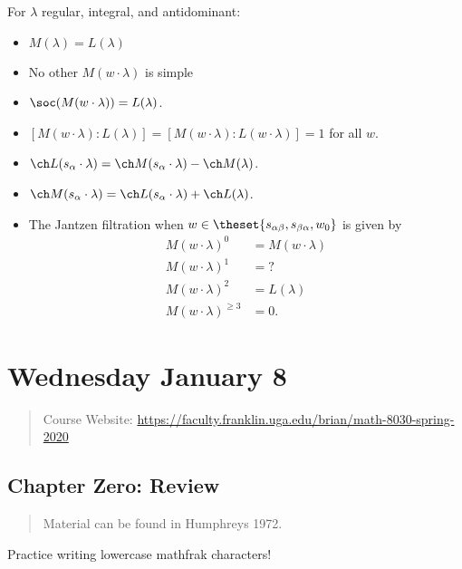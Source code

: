 For \(\lambda\) regular, integral, and antidominant:

\begin{itemize}
\tightlist
\item
  \(M(\lambda) = L(\lambda)\)
\item
  No other \(M(w\cdot \lambda)\) is simple
\item
  \(\soc(M(w\cdot \lambda)) = L(\lambda)\).
\item
  \([M(w\cdot \lambda) : L(\lambda)] = [M(w\cdot \lambda) : L(w\cdot \lambda)] = 1\)
  for all \(w\).
\item
  \(\ch L(s_\alpha \cdot \lambda) = \ch M(s_\alpha \cdot \lambda) - \ch M(\lambda)\).
\item
  \(\ch M(s_\alpha \cdot \lambda) = \ch L(s_\alpha \cdot \lambda) + \ch L(\lambda)\).
\item
  The Jantzen filtration when
  \(w \in \theset{s_{\alpha\beta}, s_{\beta\alpha}, w_0}\) is given by
  \begin{align*}
  M(w\cdot \lambda)^0 &= M(w\cdot \lambda) \\
  M(w\cdot \lambda)^1 &= ? \\
  M(w\cdot \lambda)^2 &= L(\lambda) \\
  M(w\cdot \lambda)^{\geq 3} &= 0
  .\end{align*}
\end{itemize}

\hypertarget{wednesday-january-8}{%
\section{Wednesday January 8}\label{wednesday-january-8}}

\begin{quote}
Course Website:
\url{https://faculty.franklin.uga.edu/brian/math-8030-spring-2020}
\end{quote}

\hypertarget{chapter-zero-review}{%
\subsection{Chapter Zero: Review}\label{chapter-zero-review}}

\begin{quote}
Material can be found in Humphreys 1972.
\end{quote}

\begin{exercise}

Practice writing lowercase mathfrak characters!

\end{exercise}

